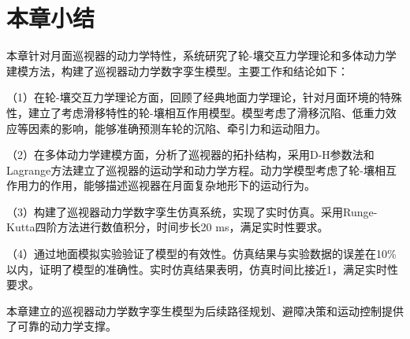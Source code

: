 \section{本章小结}
\label{sec:ch4_summary}

本章针对月面巡视器的动力学特性，系统研究了轮-壤交互力学理论和多体动力学建模方法，构建了巡视器动力学数字孪生模型。主要工作和结论如下：

（1）在轮-壤交互力学理论方面，回顾了经典地面力学理论，针对月面环境的特殊性，建立了考虑滑移特性的轮-壤相互作用模型。模型考虑了滑移沉陷、低重力效应等因素的影响，能够准确预测车轮的沉陷、牵引力和运动阻力。

（2）在多体动力学建模方面，分析了巡视器的拓扑结构，采用D-H参数法和Lagrange方法建立了巡视器的运动学和动力学方程。动力学模型考虑了轮-壤相互作用力的作用，能够描述巡视器在月面复杂地形下的运动行为。

（3）构建了巡视器动力学数字孪生仿真系统，实现了实时仿真。采用Runge-Kutta四阶方法进行数值积分，时间步长20 ms，满足实时性要求。

（4）通过地面模拟实验验证了模型的有效性。仿真结果与实验数据的误差在10\%以内，证明了模型的准确性。实时仿真结果表明，仿真时间比接近1，满足实时性要求。

本章建立的巡视器动力学数字孪生模型为后续路径规划、避障决策和运动控制提供了可靠的动力学支撑。
